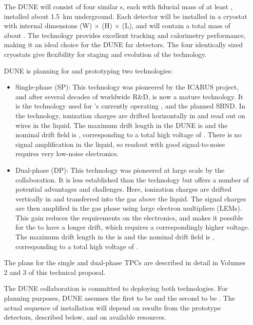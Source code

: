 The DUNE  will consist of four similar \lartpc{}s, each with fiducial mass of at least \nominalmodsize, installed about \SI{1.5}{km} underground. Each detector will be installed in a cryostat with internal dimensions
\cryostatwdth (W) $\times$ \cryostatht (H) $\times$ \cryostatlen (L), and will contain a total \lar{} mass of about \larmass{}.
The \lartpc technology provides
excellent tracking and calorimetry performance, making it an ideal
choice for the DUNE far detectors. The four identically sized cryostats give flexibility for staging and evolution of the \lartpc technology.

DUNE is planning for and prototyping two \lartpc technologies:
\begin{itemize}
\item Single-phase (SP): This technology was pioneered by the ICARUS project, and after several decades of worldwide R\&D, is now a mature technology. It is the technology used for \fnal{}'s currently operating \microboone, and the planned SBND. In the \single technology, ionization charges are drifted horizontally in \lar and read out on wires in the liquid. The maximum drift length in the DUNE  is \spmaxdrift and the nominal drift field is \spmaxfield, corresponding to a total high voltage of \sptargetdriftvoltpos. There is no signal amplification in the liquid, so readout with good signal-to-noise requires very low-noise electronics.

\item Dual-phase (DP): This technology was pioneered at large scale by the  collaboration. It is less established than the \single technology but offers a number of potential advantages and challenges. Here, ionization charges are drifted vertically in \lar and transferred into the gas above the liquid. The signal charges are then amplified in the gas phase using large electron multipliers (LEMs). This gain reduces the requirements on the electronics, and makes it possible for the  to have a longer drift, which requires a correspondingly higher voltage.
The maximum drift length in the  is \dpmaxdrift and the nominal drift field is \dpnominaldriftfield, corresponding to a total high voltage of \dptargetdriftvoltpos. 

\end{itemize}
The plans for the single and dual-phase TPCs are described in detail in Volumes 2 and 3 of this technical proposal.

The DUNE collaboration is committed to deploying both technologies. 
For planning purposes, DUNE assumes the first  to be
\single and the second to be \dual.
The actual sequence of  installation will depend on results from the prototype detectors, described below, and on available resources.


